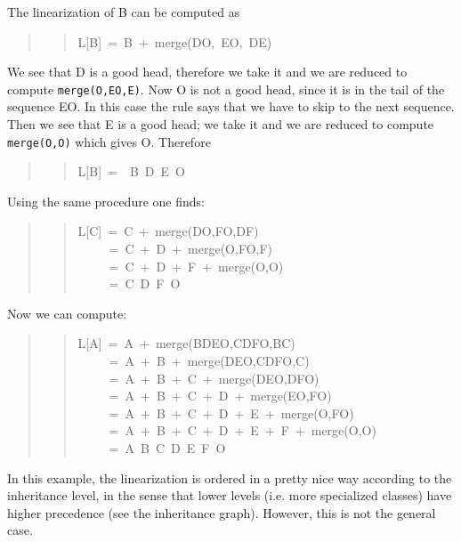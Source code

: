 \documentclass[10pt,a4paper,english]{article}
\begin{document}
The linearization of B can be computed as
\begin{quote}
\begin{quote}{\ttfamily \raggedright \noindent
L{[}B]~=~B~+~merge(DO,~EO,~DE)
}\end{quote}
\end{quote}

We see that D is a good head, therefore we take it and we are reduced to
compute \texttt{merge(O,EO,E)}.  Now O is not a good head, since it is in the
tail of the sequence EO.  In this case the rule says that we have to
skip to the next sequence.  Then we see that E is a good head; we take
it and we are reduced to compute \texttt{merge(O,O)} which gives O. Therefore
\begin{quote}
\begin{quote}{\ttfamily \raggedright \noindent
L{[}B]~=~~B~D~E~O
}\end{quote}
\end{quote}

Using the same procedure one finds:
\begin{quote}
\begin{quote}{\ttfamily \raggedright \noindent
L{[}C]~=~C~+~merge(DO,FO,DF)~\\
~~~~~=~C~+~D~+~merge(O,FO,F)~\\
~~~~~=~C~+~D~+~F~+~merge(O,O)~\\
~~~~~=~C~D~F~O
}\end{quote}
\end{quote}

Now we can compute:
\begin{quote}
\begin{quote}{\ttfamily \raggedright \noindent
L{[}A]~=~A~+~merge(BDEO,CDFO,BC)~\\
~~~~~=~A~+~B~+~merge(DEO,CDFO,C)~\\
~~~~~=~A~+~B~+~C~+~merge(DEO,DFO)~\\
~~~~~=~A~+~B~+~C~+~D~+~merge(EO,FO)~\\
~~~~~=~A~+~B~+~C~+~D~+~E~+~merge(O,FO)~\\
~~~~~=~A~+~B~+~C~+~D~+~E~+~F~+~merge(O,O)~\\
~~~~~=~A~B~C~D~E~F~O
}\end{quote}
\end{quote}

In this example, the linearization is ordered in a pretty nice way
according to the inheritance level, in the sense that lower levels (i.e.
more specialized classes) have higher precedence (see the inheritance
graph).  However, this is not the general case.
\end{document}
